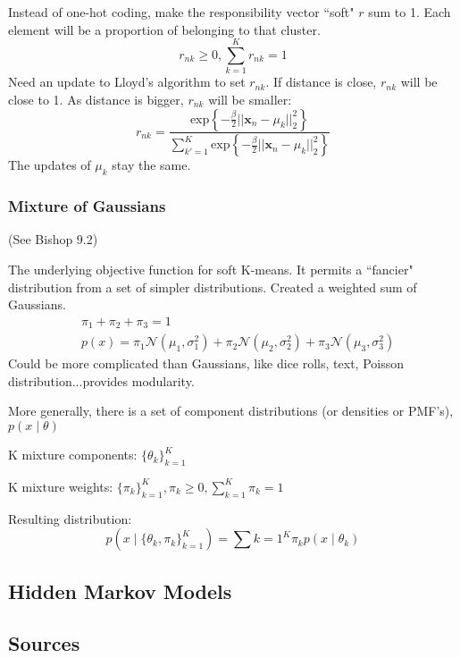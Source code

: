 \documentclass[11pt, oneside]{article}   	%
\begin{document}
Instead of one-hot coding, make the responsibility vector ``soft" $r$ sum to 1. Each element will be a proportion of belonging to that cluster.
\begin{equation}
r_{nk} \ge 0, \sum_{k=1}^K r_{nk} = 1
\end{equation}
Need an update to Lloyd's algorithm to set $r_{nk}$. If distance is close, $r_{nk}$ will be close to 1. As distance is bigger, $r_{nk}$ will be smaller:
\begin{equation}
r_{nk} = \frac{\text{exp} \left\{ -\frac{\beta}{2} ||\mathbf{x}_n - \mu_k||_2^2 \right\}}
			 {\sum_{k'=1}^K\text{exp} \left\{ -\frac{\beta}{2} ||\mathbf{x}_n - \mu_k||_2^2 \right\} }
\end{equation}
The updates of $\mu_k$ stay the same.

\subsubsection{Mixture of Gaussians}

(See Bishop 9.2)

The underlying objective function for soft K-means. It permits a ``fancier" distribution from a set of simpler distributions. Created a weighted sum of Gaussians.
\begin{align}
&\pi_1 + \pi_2 + \pi_3 = 1\\
&p(x) = \pi_1 \mathcal{N}(\mu_1,\sigma_1^2) + \pi_2 \mathcal{N}(\mu_2,\sigma_2^2) + \pi_3 \mathcal{N}(\mu_3,\sigma_3^2)
\end{align}
Could be more complicated than Gaussians, like dice rolls, text, Poisson distribution...provides modularity.

More generally, there is a set of component distributions (or densities or PMF's),  \mbox{$p(x \mid \theta)$}

K mixture components: $\{ \theta_k \}_{k=1}^K$

K mixture weights: $\{ \pi_k \}_{k=1}^K, \pi_k \ge 0, \sum_{k=1}^K \pi_k = 1$

Resulting distribution:
\begin{equation}
p(x \mid \{\theta_k, \pi_k\}_{k=1}^K) = \sum{k=1}^K \pi_k p(x \mid \theta_k)
\end{equation}

\subsection{Hidden Markov Models}

\subsection{Sources}
\end{document}
